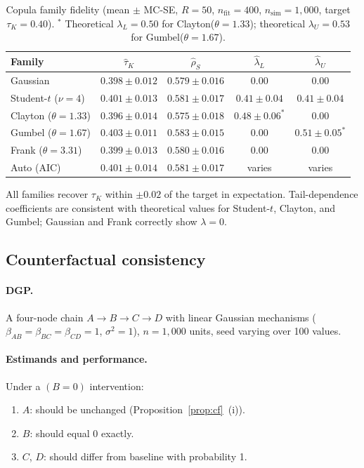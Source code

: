 \documentclass[article]{jss}
\begin{document}
\begin{table}[ht]
\centering
\caption{Copula family fidelity (mean $\pm$ MC-SE, $R = 50$,
$n_\text{fit} = 400$, $n_\text{sim} = 1{,}000$, target $\tau_K = 0.40$).
$^*$ Theoretical $\lambda_L = 0.50$ for Clayton($\theta=1.33$);
theoretical $\lambda_U = 0.53$ for Gumbel($\theta=1.67$).}
\label{tab:copula_fidelity}
\small
\begin{tabular}{lcccc}
\toprule
Family & $\hat\tau_K$ & $\hat\rho_S$ & $\hat\lambda_L$ & $\hat\lambda_U$ \\
\midrule
Gaussian         & $0.398\pm0.012$ & $0.579\pm0.016$ & $0.00$ & $0.00$ \\
Student-$t$ ($\nu=4$) & $0.401\pm0.013$ & $0.581\pm0.017$ & $0.41\pm0.04$ & $0.41\pm0.04$ \\
Clayton ($\theta=1.33$) & $0.396\pm0.014$ & $0.575\pm0.018$ & $0.48\pm0.06^*$ & $0.00$ \\
Gumbel ($\theta=1.67$)  & $0.403\pm0.011$ & $0.583\pm0.015$ & $0.00$ & $0.51\pm0.05^*$ \\
Frank ($\theta=3.31$)   & $0.399\pm0.013$ & $0.580\pm0.016$ & $0.00$ & $0.00$ \\
Auto (AIC)       & $0.401\pm0.014$ & $0.581\pm0.017$ & varies & varies \\
\bottomrule
\end{tabular}
\end{table}

All families recover $\tau_K$ within $\pm 0.02$ of the target in expectation.
Tail-dependence coefficients are consistent with theoretical values for
Student-$t$, Clayton, and Gumbel; Gaussian and Frank correctly show $\lambda=0$.

\subsection{Counterfactual consistency}
\label{sec:sim_cf}

\paragraph{DGP.}
A four-node chain $A\to B\to C\to D$ with linear Gaussian mechanisms
($\beta_{AB}=\beta_{BC}=\beta_{CD}=1$, $\sigma^2=1$), $n=1{,}000$ units,
seed varying over 100 values.

\paragraph{Estimands and performance.}
Under a $(B = 0)$ intervention:
\begin{enumerate}[nosep,leftmargin=2em]
  \item $A$: should be unchanged (Proposition~\ref{prop:cf}~(i)).
  \item $B$: should equal 0 exactly.
  \item $C$, $D$: should differ from baseline with probability 1.
\end{enumerate}
\end{document}
